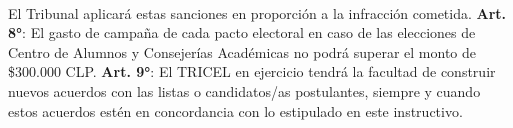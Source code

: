 \documentclass{caitemplate}
\begin{document}
\\
El Tribunal aplicará estas sanciones en proporción a la infracción cometida.
\newline
\newline
\textbf{Art. 8°}: El gasto de campaña de cada pacto electoral en caso de las elecciones de Centro de Alumnos y Consejerías Académicas no podrá superar el monto de \$300.000 CLP.
\newline
\newline
\textbf{Art. 9°}: El TRICEL en ejercicio tendrá la facultad de construir nuevos acuerdos con las listas o candidatos/as postulantes, siempre y cuando estos acuerdos estén en concordancia con lo estipulado en este instructivo.
\end{document}
